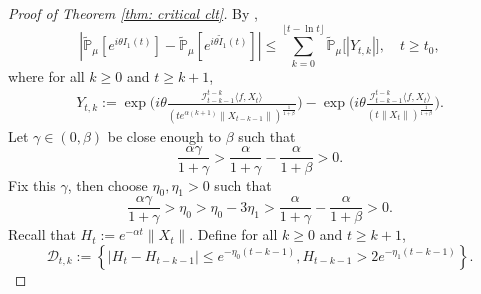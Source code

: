 \documentclass[12pt,a4paper]{amsart}
\theoremstyle{plain}
\theoremstyle{definition}
\numberwithin{equation}{section}
\begin{document}
\begin{proof}[Proof of Theorem \ref{thm: critical clt}]
    By \cite[Lemma 3.4.3]{Durrett2010Probability},
\begin{equation}\label{ineq: control of I1t}
    |\mathbb{\tilde{P}}_{\mu}[e^{i\theta I_1(t)}] - \mathbb{\tilde{P}}_{\mu} [e^{i\theta\tilde{I}_1(t)}]|
    \leq \sum_{k=0}^{\lfloor t-\ln t \rfloor}\mathbb{\tilde{P}}_{\mu}\big[|Y_{t,k}|\big],
    \quad t\geq t_0,
\end{equation}
    where for all $k \geq 0$ and $t\geq k+1$,
\begin{align}
    Y_{t,k}
    :=\exp\Big(i\theta\frac{\mathcal I_{t-k-1}^{t-k}\langle f ,X_t\rangle}{(t e^{\alpha(k+1)}\|X_{t-k-1}\|)^{\frac{1}{1+\beta}}}\Big)-\exp\Big(i\theta\frac{\mathcal I_{t-k-1}^{t-k}\langle f ,X_t\rangle}{(t\|X_t\|)^{\frac{1}{1+\beta}}}\Big).
\end{align}
    Let $\gamma \in (0,\beta)$ be close enough to $\beta$ such that
\[
    \frac{\alpha \gamma}{1+\gamma} > \frac{\alpha}{1+\gamma} - \frac{\alpha}{1+\beta} > 0.
\]
    Fix this $\gamma$, then choose $\eta_0,\eta_1>0$ such that
\[
    \frac{\alpha \gamma}{1+\gamma} >\eta_0 > \eta_0 - 3\eta_1 > \frac{\alpha}{1+\gamma} - \frac{\alpha}{1+\beta} > 0.
\]
    Recall that $H_t := e^{-\alpha t}\|X_t\|$.
    Define for all $k \geq 0$ and $t\geq k+1$,
\begin{equation}
\label{def: Dtk}
    \mathcal{D}_{t,k}:=\left\{|H_t-H_{t-k-1}|\leq  e^{-\eta_0 (t-k-1)}, H_{t-k-1}> 2e^{-\eta_1(t-k-1)}\right\}.
\end{equation}


\end{proof}
\end{document}
